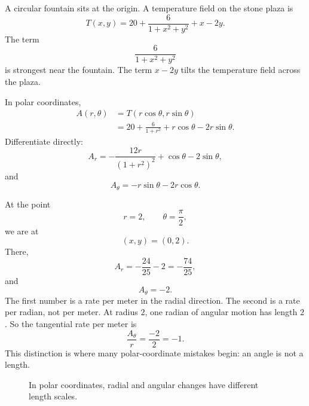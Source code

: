 \begin{example}
A circular fountain sits at the origin.  A temperature field on the stone plaza is
\[
    T(x,y)=20+\frac{6}{1+x^2+y^2}+x-2y.
\]
The term
\[
    \frac{6}{1+x^2+y^2}
\]
is strongest near the fountain.  The term \(x-2y\) tilts the temperature field across
the plaza.

In polar coordinates,
\[
\begin{aligned}
A(r,\theta)
&=
T(r\cos\theta,r\sin\theta)\\
&=
20+\frac{6}{1+r^2}+r\cos\theta-2r\sin\theta.
\end{aligned}
\]
Differentiate directly:
\[
    A_r
    =
    -\frac{12r}{(1+r^2)^2}+\cos\theta-2\sin\theta,
\]
and
\[
    A_\theta
    =
    -r\sin\theta-2r\cos\theta.
\]

At the point
\[
    r=2,
    \qquad
    \theta=\frac{\pi}{2},
\]
we are at
\[
    (x,y)=(0,2).
\]
There,
\[
    A_r
    =
    -\frac{24}{25}-2
    =
    -\frac{74}{25},
\]
and
\[
    A_\theta=-2.
\]
The first number is a rate per meter in the radial direction.  The second is a rate per
radian, not per meter.  At radius \(2\), one radian of angular motion has length \(2\).
So the tangential rate per meter is
\[
    \frac{A_\theta}{r}=\frac{-2}{2}=-1.
\]
This distinction is where many polar-coordinate mistakes begin: an angle is not a
length.
\end{example}

\begin{figure}[h]
\centering
{}
\caption{In polar coordinates, radial and angular changes have different length scales.}
\end{figure}

